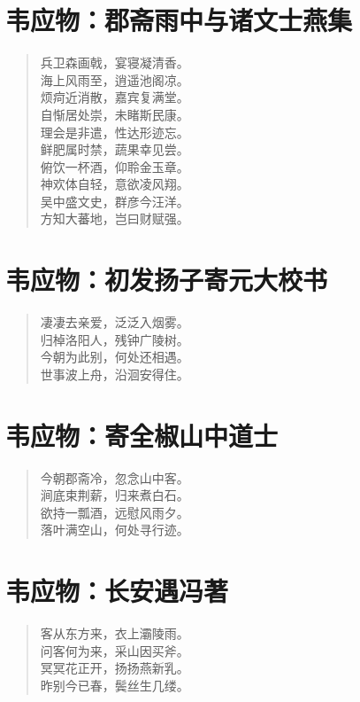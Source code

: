 \documentclass[12pt,oneside]{book}
\newenvironment{shici}{%
\begin{verse}\centering\yanti\large\hspace{12pt}}{\end{verse}}
\begin{document}
\begin{common-format}
\chapter{韦应物：郡斋雨中与诸文士燕集}
\begin{shici}
兵卫森画戟，宴寝凝清香。\\
海上风雨至，逍遥池阁凉。\\
烦疴近消散，嘉宾复满堂。\\
自惭居处崇，未睹斯民康。\\
理会是非遣，性达形迹忘。\\
鲜肥属时禁，蔬果幸见尝。\\
俯饮一杯酒，仰聆金玉章。\\
神欢体自轻，意欲凌风翔。\\
吴中盛文史，群彦今汪洋。\\
方知大蕃地，岂曰财赋强。
\end{shici}

\chapter{韦应物：初发扬子寄元大校书}
\begin{shici}
凄凄去亲爱，泛泛入烟雾。\\
归棹洛阳人，残钟广陵树。\\
今朝为此别，何处还相遇。\\
世事波上舟，沿洄安得住。
\end{shici}

\chapter{韦应物：寄全椒山中道士}
\begin{shici}
今朝郡斋冷，忽念山中客。\\
涧底束荆薪，归来煮白石。\\
欲持一瓢酒，远慰风雨夕。\\
落叶满空山，何处寻行迹。
\end{shici}

\chapter{韦应物：长安遇冯著}
\begin{shici}
客从东方来，衣上灞陵雨。\\
问客何为来，采山因买斧。\\
冥冥花正开，扬扬燕新乳。\\
昨别今已春，鬓丝生几缕。
\end{shici}


\end{common-format}
\end{document}
